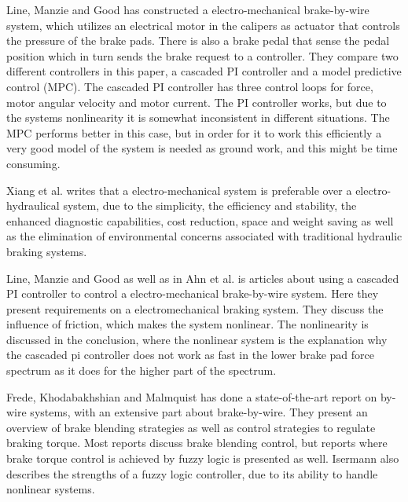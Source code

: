 \documentclass[a4paper,11pt]{kth-mag}
\begin{document}
\vspace{5mm}
Line, Manzie and Good \cite{4475522} has constructed a electro-mechanical  brake-by-wire system, which utilizes an electrical motor in the calipers as actuator that controls the pressure of the brake pads. There is also a brake pedal that sense the pedal position which in turn sends the brake request to a controller. They compare two different controllers in this paper, a cascaded PI controller and a model predictive control (MPC). The cascaded PI controller has three control loops for force, motor angular velocity and motor current. The PI controller works, but due to the systems nonlinearity it is somewhat inconsistent in different situations. The MPC performs better in this case, but in order for it to work this efficiently a very good model of the system is needed as ground work, and this might be time consuming. \newline


Xiang et al. \cite{Xiang} writes that a electro-mechanical system is preferable over a electro-hydraulical system, due to the simplicity, the efficiency and stability, the enhanced diagnostic capabilities, cost reduction, space and weight saving as well as the elimination of environmental concerns associated with traditional hydraulic braking systems.\newline

Line, Manzie and Good \cite{2004-01-2050} as well as in Ahn et al. \cite{ahn2009analysis} is articles about using a cascaded PI controller to control a electro-mechanical brake-by-wire system. Here they present requirements on a electromechanical braking system. They discuss the influence of friction, which makes the system nonlinear. The nonlinearity is discussed in the conclusion, where the nonlinear system is the explanation why the cascaded pi controller does not work as fast in the lower brake pad force spectrum as it does for the higher part of the spectrum. \newline



Frede, Khodabakhshian and Malmquist \cite{Frede460614} has done a state-of-the-art report on by-wire systems, with an extensive part about brake-by-wire. They present an overview of brake blending strategies as well as control strategies to regulate braking torque. Most reports discuss brake blending control, but reports where  brake torque control is achieved by fuzzy logic is presented as well. Isermann \cite{661149} also describes the strengths of a fuzzy logic controller, due to its ability to handle nonlinear systems. \newline
\end{document}
